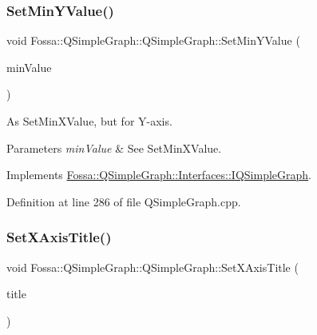 \subsubsection{\texorpdfstring{Set\+Min\+Y\+Value()}{SetMinYValue()}}
{\footnotesize\ttfamily void Fossa\+::\+Q\+Simple\+Graph\+::\+Q\+Simple\+Graph\+::\+Set\+Min\+Y\+Value (\begin{DoxyParamCaption}\item[{double}]{min\+Value }\end{DoxyParamCaption})\hspace{0.3cm}{\ttfamily [virtual]}}



As Set\+Min\+X\+Value, but for Y-\/axis. 


\begin{DoxyParams}{Parameters}
{\em min\+Value} & See Set\+Min\+X\+Value. \\
\hline
\end{DoxyParams}


Implements \hyperlink{class_fossa_1_1_q_simple_graph_1_1_interfaces_1_1_i_q_simple_graph_a3fdd1f6b538e2dfbf4a0140acd6b6e94}{Fossa\+::\+Q\+Simple\+Graph\+::\+Interfaces\+::\+I\+Q\+Simple\+Graph}.



Definition at line 286 of file Q\+Simple\+Graph.\+cpp.

\mbox{\label{class_fossa_1_1_q_simple_graph_1_1_q_simple_graph_a7579da572b54d43ccec3d2bd572b6cfa}} 
\subsubsection{\texorpdfstring{Set\+X\+Axis\+Title()}{SetXAxisTitle()}}
{\footnotesize\ttfamily void Fossa\+::\+Q\+Simple\+Graph\+::\+Q\+Simple\+Graph\+::\+Set\+X\+Axis\+Title (\begin{DoxyParamCaption}\item[{Q\+String}]{title }\end{DoxyParamCaption})\hspace{0.3cm}{\ttfamily [virtual]}}



